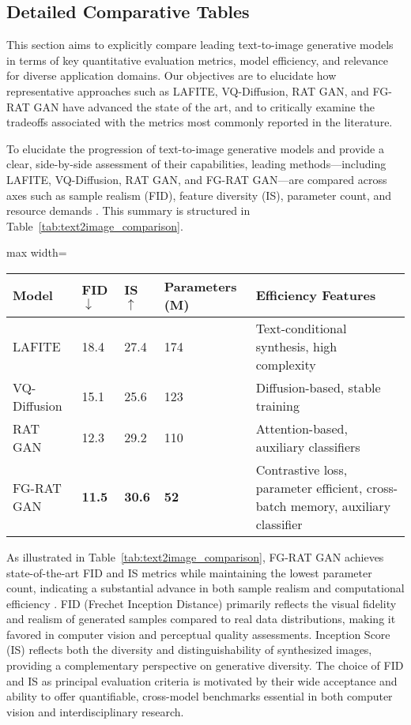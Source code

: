 \documentclass[sigconf]{acmart}
\begin{document}
\subsection{Detailed Comparative Tables}

This section aims to explicitly compare leading text-to-image generative models in terms of key quantitative evaluation metrics, model efficiency, and relevance for diverse application domains. Our objectives are to elucidate how representative approaches such as LAFITE, VQ-Diffusion, RAT GAN, and FG-RAT GAN have advanced the state of the art, and to critically examine the tradeoffs associated with the metrics most commonly reported in the literature.

To elucidate the progression of text-to-image generative models and provide a clear, side-by-side assessment of their capabilities, leading methods—including LAFITE, VQ-Diffusion, RAT GAN, and FG-RAT GAN—are compared across axes such as sample realism (FID), feature diversity (IS), parameter count, and resource demands \cite{ref101}. This summary is structured in Table~\ref{tab:text2image_comparison}.

\begin{table*}[htbp]
\centering
\caption{Comparison of leading text-to-image generation models on major metrics.}
\label{tab:text2image_comparison}
\begin{adjustbox}{max width=\textwidth}
\begin{tabular}{lllll}
\toprule
\textbf{Model} & \textbf{FID} $\downarrow$ & \textbf{IS} $\uparrow$ & \textbf{Parameters (M)} & \textbf{Efficiency Features} \\
\midrule
LAFITE      & 18.4    & 27.4   & 174     & Text-conditional synthesis, high complexity \\
VQ-Diffusion& 15.1    & 25.6   & 123     & Diffusion-based, stable training \\
RAT GAN     & 12.3    & 29.2   & 110     & Attention-based, auxiliary classifiers \\
FG-RAT GAN  & \textbf{11.5}    & \textbf{30.6}   & \textbf{52}      & Contrastive loss, parameter efficient, cross-batch memory, auxiliary classifier \\
\bottomrule
\end{tabular}
\end{adjustbox}
\end{table*}

As illustrated in Table~\ref{tab:text2image_comparison}, FG-RAT GAN achieves state-of-the-art FID and IS metrics while maintaining the lowest parameter count, indicating a substantial advance in both sample realism and computational efficiency \cite{ref101}. FID (Frechet Inception Distance) primarily reflects the visual fidelity and realism of generated samples compared to real data distributions, making it favored in computer vision and perceptual quality assessments. Inception Score (IS) reflects both the diversity and distinguishability of synthesized images, providing a complementary perspective on generative diversity. The choice of FID and IS as principal evaluation criteria is motivated by their wide acceptance and ability to offer quantifiable, cross-model benchmarks essential in both computer vision and interdisciplinary research.
\end{document}
